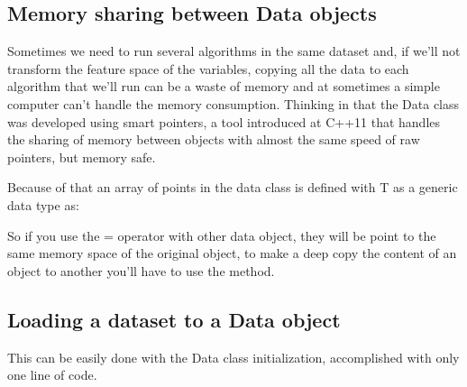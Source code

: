 \documentclass[letterpaper,10pt,english]{sphinxmanual}
\begin{document}
\subsection{Memory sharing between Data objects}
\label{\detokenize{getting_started/datamanagement:memory-sharing-between-data-objects}}\label{\detokenize{getting_started/datamanagement:datamemorysharing}}
\sphinxAtStartPar
Sometimes we need to run several algorithms in the same dataset and, if we’ll not transform the feature space of the variables, copying all the data to each algorithm that we’ll run can be a waste of memory and at sometimes a simple computer can’t handle the memory consumption.
Thinking in that the Data class was developed using smart pointers, a tool introduced at C++11 that handles the sharing of memory between objects with almost the same speed of raw pointers, but memory safe.

\sphinxAtStartPar
Because of that an array of points in the data class is defined with T as a generic data type as:

\begin{sphinxVerbatim}[commandchars=\\\{\}]
     
\end{sphinxVerbatim}

\sphinxAtStartPar
So if you use the = operator with other data object, they will be point to the same memory space of the original object, to make a deep copy the content of an object to another you’ll have to use the  method.

\begin{sphinxVerbatim}[commandchars=\\\{\}]
 

  
\end{sphinxVerbatim}


\subsection{Loading a dataset to a Data object}
\label{\detokenize{getting_started/datamanagement:loading-a-dataset-to-a-data-object}}\label{\detokenize{getting_started/datamanagement:loadingdataset}}
\sphinxAtStartPar
This can be easily done with the Data class initialization, accomplished with only one line of code.
\end{document}
